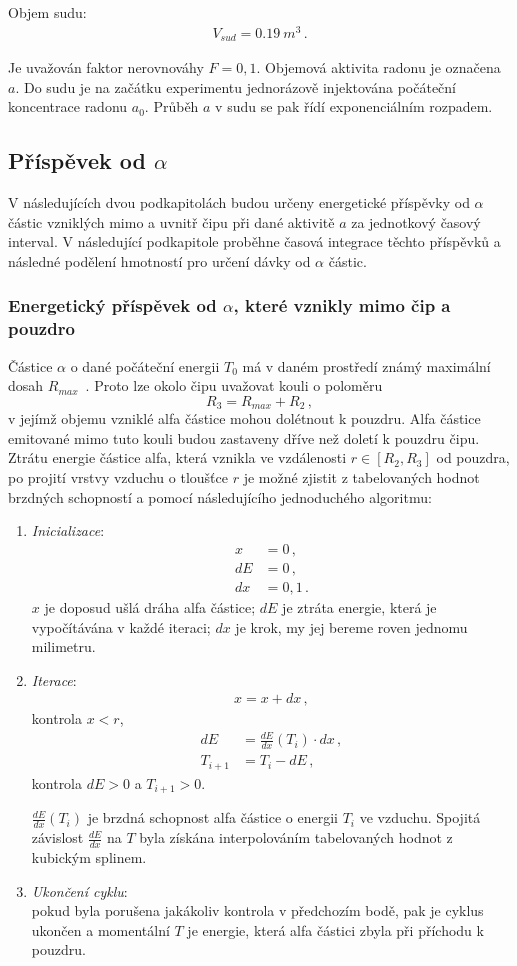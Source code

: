 \documentclass[11pt,a4paper]{article}
\begin{document}
Objem sudu:
\begin{align}
	V_{sud}=\SI{0,19}{m^3}\,.
\end{align}

Je uvažován faktor nerovnováhy $F=0,1$. Objemová aktivita radonu je označena $a$. Do sudu je na začátku experimentu jednorázově injektována počáteční koncentrace radonu $a_0$. Průběh $a$ v sudu se pak řídí exponenciálním rozpadem.
\subsection{Příspěvek od $\alpha$}
V následujících dvou podkapitolách budou určeny energetické příspěvky od $\alpha$ částic vzniklých mimo a uvnitř čipu při dané aktivitě $a$ za jednotkový časový interval. V následující podkapitole proběhne časová integrace těchto příspěvků a následné podělení hmotností pro určení dávky od $\alpha$ částic.
\subsubsection{Energetický příspěvek od $\alpha$, které vznikly mimo čip a pouzdro}
Částice $\alpha$ o dané počáteční energii $T_0$ má v daném prostředí známý maximální dosah $R_{max}$~\cite{astar}. Proto lze okolo čipu uvažovat kouli o poloměru 
$$R_3=R_{max}+R_2\,,$$
v jejímž objemu vzniklé alfa částice mohou dolétnout k pouzdru. Alfa částice emitované mimo tuto kouli budou zastaveny dříve než doletí k pouzdru čipu. Ztrátu energie částice alfa, která vznikla ve vzdálenosti $r\in[R_2, R_3]$ od pouzdra, po projití vrstvy vzduchu o tloušťce $r$ je možné zjistit z tabelovaných hodnot brzdných schopností \cite{astar} a pomocí následujícího jednoduchého algoritmu:
\begin{enumerate}
	\item \emph{Inicializace}:
	\begin{align*}
	x&=0\,,\\
	  dE&=0\,,\\
	   dx&=0,1\,.
	   \end{align*}
	  $x$ je doposud ušlá dráha alfa částice; $dE$ je ztráta energie, která je vypočítávána v každé iteraci; $dx$ je krok, my jej bereme roven jednomu milimetru.
	\item \emph{Iterace}:
	\begin{align}
		x = x+dx\,,
	\end{align}
	kontrola $x<r$,
	\begin{align*}
	dE &= \frac{dE}{dx}(T_i)\cdot dx\,,\\    
	T_{i+1} &= T_i - dE\,,
	\end{align*}  
	kontrola $dE>0$ a $T_{i+1}>0$. 

$\frac{dE}{dx}(T_i)$ je brzdná schopnost alfa částice o energii $T_i$ ve vzduchu. Spojitá závislost $\frac{dE}{dx}$ na $T$ byla získána interpolováním tabelovaných hodnot z~\cite{astar} kubickým splinem.
\item \emph{Ukončení cyklu}:\\
pokud byla porušena jakákoliv kontrola v předchozím bodě, pak je cyklus ukončen a momentální $T$ je energie, která alfa částici zbyla při příchodu k pouzdru.
\end{enumerate}
\end{document}
